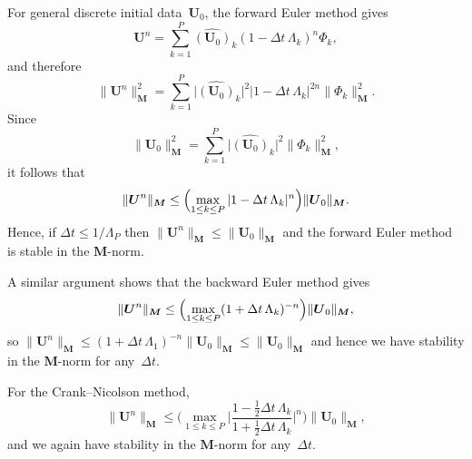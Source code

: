 \begin{example}\label{example: forward Euler FEM}
For general discrete initial data~$\boldsymbol{U}_0$, the forward Euler method 
gives
\[
\boldsymbol{U}^n=\sum_{k=1}^P\widehat{(\boldsymbol{U}_0)}_k 
    (1-\Delta t\,\Lambda_k)^n\Phi_k,
\]
and therefore
\[
\|\boldsymbol{U}^n\|_{\boldsymbol{M}}^2
    =\sum_{k=1}^P\bigl|\widehat{(\boldsymbol{U}_0)}_k\bigr|^2
    |1-\Delta t\,\Lambda_k|^{2n}\|\Phi_k\|_{\boldsymbol{M}}^2.
\]
Since
\[
\|\boldsymbol{U}_0\|_{\boldsymbol{M}}^2
    =\sum_{k=1}^P\bigl|\widehat{(\boldsymbol{U}_0)}_k\bigr|^2
    \|\Phi_k\|_{\boldsymbol{M}}^2,
\]
it follows that
\[
\|\boldsymbol{U}^n\|_{\boldsymbol{M}}
    \le\Bigl(\max_{1\le k\le P}|1-\Delta t\,\Lambda_k|^n\Bigr)
    \|\boldsymbol{U}_0\|_{\boldsymbol{M}}.
\]
Hence, if $\Delta t\le 1/\Lambda_P$ then $\|\boldsymbol{U}^n\|_{\boldsymbol{M}}
\le\|\boldsymbol{U}_0\|_{\boldsymbol{M}}$ and the forward Euler method is 
stable in the $\boldsymbol{M}$-norm.
\end{example}

\begin{example}
A similar argument shows that the backward Euler method gives
\[
\|\boldsymbol{U}^n\|_{\boldsymbol{M}}
    \le\Bigl(\max_{1\le k\le P}(1+\Delta t\,\Lambda_k)^{-n}\Bigr)
    \|\boldsymbol{U}_0\|_{\boldsymbol{M}},
\]
so $\|\boldsymbol{U}^n\|_{\boldsymbol{M}}\le(1+\Delta t\,\Lambda_1)^{-n}
\|\boldsymbol{U}_0\|_{\boldsymbol{M}}\le\|\boldsymbol{U}_0\|_{\boldsymbol{M}}$
and hence we have stability in the $\boldsymbol{M}$-norm for any~$\Delta t$.
\end{example}

\begin{example}
For the Crank--Nicolson method,
\[
\|\boldsymbol{U}^n\|_{\boldsymbol{M}}
    \le\biggl(\max_{1\le k\le P}\biggl|
    \frac{1-\tfrac12\Delta t\,\Lambda_k}{1+\tfrac12\Delta t\,\Lambda_k}
    \biggr|^n\biggr)\|\boldsymbol{U}_0\|_{\boldsymbol{M}},
\]
and we again have stability in the $\boldsymbol{M}$-norm for any~$\Delta t$.
\end{example}

